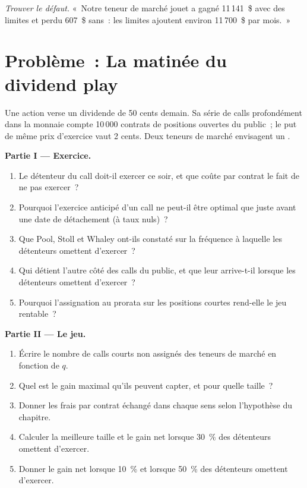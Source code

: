 \begin{exercise}[$\star\star\star$]\label{exo:dv:options-market-making-in-practice:8}
\emph{Trouver le défaut.} «~Notre teneur de marché jouet a gagné 11\,141~\$ avec des limites et perdu 607~\$ sans~: les limites ajoutent environ 11\,700~\$ par mois.~»
\end{exercise}

\section{Problème~: La matinée du dividend play}

\begin{problem}\label{pb:dv:options-market-making-in-practice:1}
Une action verse un dividende de 50 cents demain. Sa série de calls profondément dans la monnaie compte 10\,000 contrats de positions ouvertes du public~; le put de même prix d'exercice vaut 2
cents. Deux teneurs de marché envisagent un .

\medskip\noindent\textbf{Partie I --- Exercice.}
\begin{enumerate}
\item Le détenteur du call doit-il exercer ce soir, et que coûte par contrat le fait de ne pas exercer~?
\item Pourquoi l'exercice anticipé d'un call ne peut-il être optimal que juste avant une date de détachement (à taux nuls)~?
\item Que Pool, Stoll et Whaley ont-ils constaté sur la fréquence à laquelle les détenteurs omettent d'exercer~?
\item Qui détient l'autre côté des calls du public, et que leur arrive-t-il lorsque les détenteurs omettent d'exercer~?
\item Pourquoi l'assignation au prorata sur les positions courtes rend-elle le jeu rentable~?
\end{enumerate}

\medskip\noindent\textbf{Partie II --- Le jeu.}
\begin{enumerate}[resume]
\item Écrire le nombre de calls courts non assignés des teneurs de marché en fonction de $q$.
\item Quel est le gain maximal qu'ils peuvent capter, et pour quelle taille~?
\item Donner les frais par contrat échangé dans chaque sens selon l'hypothèse du chapitre.
\item Calculer la meilleure taille et le gain net lorsque 30~\% des détenteurs omettent d'exercer.
\item Donner le gain net lorsque 10~\% et lorsque 50~\% des détenteurs omettent d'exercer.
\end{enumerate}


\end{problem}
